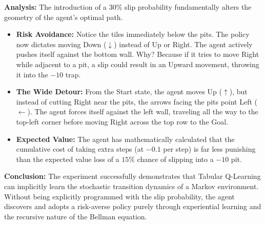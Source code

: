 \textbf{Analysis:} The introduction of a $30\%$ slip probability fundamentally alters the geometry of the agent's optimal path.
\begin{itemize}
    \item \textbf{Risk Avoidance:} Notice the tiles immediately below the pits. The policy now dictates moving Down ($\downarrow$) instead of Up or Right. The agent actively pushes itself against the bottom wall. Why? Because if it tries to move Right while adjacent to a pit, a slip could result in an Upward movement, throwing it into the $-10$ trap.
    \item \textbf{The Wide Detour:} From the Start state, the agent moves Up ($\uparrow$), but instead of cutting Right near the pits, the arrows facing the pits point Left ($\leftarrow$). The agent forces itself against the left wall, traveling all the way to the top-left corner before moving Right across the top row to the Goal.
    \item \textbf{Expected Value:} The agent has mathematically calculated that the cumulative cost of taking extra steps (at $-0.1$ per step) is far less punishing than the expected value loss of a $15\%$ chance of slipping into a $-10$ pit.
\end{itemize}

\textbf{Conclusion:} The experiment successfully demonstrates that Tabular Q-Learning can implicitly learn the stochastic transition dynamics of a Markov environment. Without being explicitly programmed with the slip probability, the agent discovers and adopts a risk-averse policy purely through experiential learning and the recursive nature of the Bellman equation.
